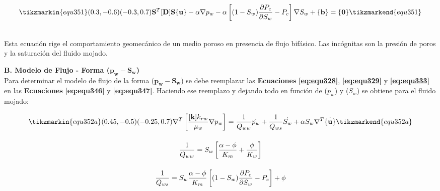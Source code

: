 \begin{ceqn} 
\begin{gather} \label{eq:equ351}
\tikzmarkin{equ351}(0.3,-0.6)(-0.3,0.7)
\normalsize{\mathbf{S}^T[\mathbf{D}]\mathbf{S}\{\mathbf{u}\} - 
\alpha\mathbf{\nabla}p_w
- \alpha \left[(1-S_w) \frac{\partial P_c}{\partial S_w} -P_c\right] \mathbf{\nabla}S_w 
+ \{\mathbf{b}\} = \{\mathbf{0}\}}
\tikzmarkend{equ351}
\end{gather}  
\end{ceqn}
\\
Esta ecuación rige el comportamiento geomecánico de un medio poroso en presencia de flujo bifásico. Las incógnitas son la presión de poros y la saturación del fluido mojado.


\vspace{0.7cm}
\textbf{B. Modelo de Flujo - Forma ($\mathbf{p_w-S_w}$)}
\\
Para determinar el modelo de flujo de la forma ($\mathbf{p_w-S_w}$) se debe reemplazar las \textbf{Ecuaciones} \textbf{\ref{eq:equ328}}, \textbf{\ref{eq:equ329}} y \textbf{\ref{eq:equ333}} en las \textbf{Ecuaciones} \textbf{\ref{eq:equ346}} y \textbf{\ref{eq:equ347}}. Haciendo ese reemplazo y dejando todo en función de ($p_w$) y ($S_w$) se obtiene para el fluido mojado:


\begin{ceqn} 
\begin{subequations} \label{eq:equ352} 
\begin{gather}
\tikzmarkin{equ352a}(0.45,-0.5)(-0.25,0.7)
\nabla^T \left[\frac{[\mathbf{k}] k_{rw}}{\mu_{w}}\nabla p_w\right] = 
\frac{1}{Q_{ww}} \dot{p_w} + \frac{1}{Q_{ws}} \dot{S_w} +\alpha S_w \nabla^T \dot{\{\mathbf{u}\}} 
\tikzmarkend{equ352a}
\label{eq:equ352a} \\[12pt]
\frac{1}{Q_{ww}} = S_w \left[ \frac{\alpha - \phi}{K_m} + \frac{\phi}{K_w} \right]  \label{eq:equ352b} \\[12pt]
\frac{1}{Q_{ws}} = S_w \frac{\alpha - \phi}{K_m} \left[(1-S_w)\frac{\partial P_c}{\partial S_w} - P_c \right] + \phi  \label{eq:equ352c}
\end{gather}  
\end{subequations} 
\end{ceqn}


